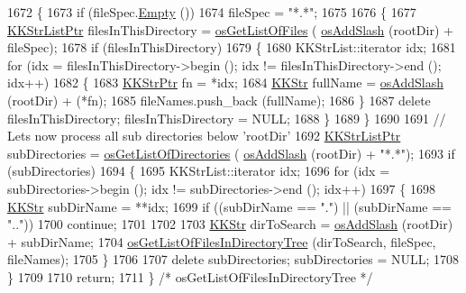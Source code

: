 \begin{DoxyCode}
1672 \{ 
1673   \textcolor{keywordflow}{if}  (fileSpec.\hyperlink{class_k_k_b_1_1_k_k_str_ac69942f73fffd672ec2a6e1c410afdb6}{Empty} ())
1674     fileSpec = \textcolor{stringliteral}{"*.*"};
1675 
1676   \{
1677     \hyperlink{class_k_k_b_1_1_k_k_str_list}{KKStrListPtr}  filesInThisDirectory = \hyperlink{namespace_k_k_b_a47f37fe64afeebf0baffdf389148c3ba}{osGetListOfFiles} (
      \hyperlink{namespace_k_k_b_aa0d40119b911df4283399a1724cab1ef}{osAddSlash} (rootDir) + fileSpec);
1678     \textcolor{keywordflow}{if}  (filesInThisDirectory)
1679     \{
1680       KKStrList::iterator  idx;
1681       \textcolor{keywordflow}{for}  (idx = filesInThisDirectory->begin ();  idx != filesInThisDirectory->end ();  idx++)
1682       \{
1683         \hyperlink{class_k_k_b_1_1_k_k_str}{KKStrPtr}  fn = *idx;
1684         \hyperlink{class_k_k_b_1_1_k_k_str}{KKStr}  fullName = \hyperlink{namespace_k_k_b_aa0d40119b911df4283399a1724cab1ef}{osAddSlash} (rootDir) + (*fn);
1685         fileNames.push\_back (fullName);
1686       \}
1687       \textcolor{keyword}{delete}  filesInThisDirectory;  filesInThisDirectory = NULL;
1688     \}
1689   \}
1690 
1691   \textcolor{comment}{// Lets now process all sub directories below 'rootDir'}
1692   \hyperlink{class_k_k_b_1_1_k_k_str_list}{KKStrListPtr}  subDirectories = \hyperlink{namespace_k_k_b_a5a4fe85032282128eb06725d1f8e8b53}{osGetListOfDirectories} (
      \hyperlink{namespace_k_k_b_aa0d40119b911df4283399a1724cab1ef}{osAddSlash} (rootDir) + \textcolor{stringliteral}{"*.*"});
1693   \textcolor{keywordflow}{if}  (subDirectories)
1694   \{
1695     KKStrList::iterator  idx;
1696     \textcolor{keywordflow}{for}  (idx = subDirectories->begin ();  idx != subDirectories->end ();  idx++)
1697     \{
1698       \hyperlink{class_k_k_b_1_1_k_k_str}{KKStr} subDirName = **idx;
1699       \textcolor{keywordflow}{if}  ((subDirName == \textcolor{stringliteral}{"."})  ||  (subDirName == \textcolor{stringliteral}{".."}))
1700         \textcolor{keywordflow}{continue};
1701 
1702 
1703       \hyperlink{class_k_k_b_1_1_k_k_str}{KKStr}  dirToSearch = \hyperlink{namespace_k_k_b_aa0d40119b911df4283399a1724cab1ef}{osAddSlash} (rootDir) + subDirName;
1704       \hyperlink{namespace_k_k_b_a658ca60982f22259e03c60da4aebad8e}{osGetListOfFilesInDirectoryTree} (dirToSearch, fileSpec, fileNames);
1705     \}
1706 
1707     \textcolor{keyword}{delete}  subDirectories;  subDirectories = NULL;
1708   \}
1709 
1710   \textcolor{keywordflow}{return};
1711 \}  \textcolor{comment}{/* osGetListOfFilesInDirectoryTree */}
\end{DoxyCode}
